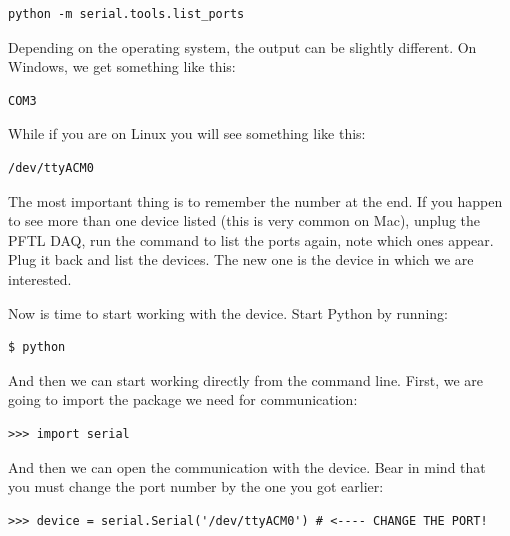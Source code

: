 \begin{verbatim}
python -m serial.tools.list_ports
\end{verbatim}


Depending on the operating system, the output can be slightly different. On Windows, we get something like this:

\begin{verbatim}
COM3
\end{verbatim}

While if you are on Linux you will see something like this:

\begin{verbatim}
/dev/ttyACM0
\end{verbatim}

The most important thing is to remember the number at the end. If you happen to see more than one device listed (this is very common on Mac), unplug the {PFTL DAQ}, run the command to list the ports again, note which ones appear. Plug it back and list the devices. The new one is the device in which we are interested.

Now is time to start working with the device. Start Python by running:

\begin{verbatim}
$ python
\end{verbatim}

And then we can start working directly from the command line. First, we are going to import the package we need for communication:

\begin{verbatim}
>>> import serial
\end{verbatim}


And then we can open the communication with the device. Bear in mind that you must change the port number by the one you got earlier:

\begin{verbatim}
>>> device = serial.Serial('/dev/ttyACM0') # <---- CHANGE THE PORT!
\end{verbatim}


